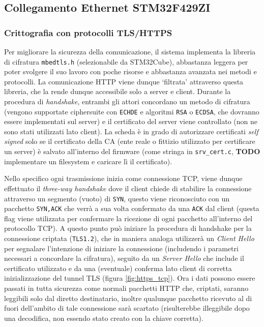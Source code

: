 \subsection{Collegamento Ethernet STM32F429ZI}

\subsubsection{Crittografia con protocolli TLS/HTTPS}

Per migliorare la sicurezza della comunicazione, il sistema implementa la libreria di cifratura \texttt{mbedtls.h} (selezionabile da STM32Cube), abbastanza leggera per poter svolgere il suo lavoro con poche risorse e abbastanza avanzata nei metodi e protocolli. La comunicazione HTTP viene dunque `filtrata' attraverso questa libreria, che la rende dunque accessibile solo a server e client. Durante la procedura di \textit{handshake}, entrambi gli attori concordano un metodo di cifratura (vengono supportate ciphersuite con \texttt{ECHDE} e algoritmi \texttt{RSA} o \texttt{ECDSA}, che dovranno essere implementati sul server) e il certificato del server viene controllato (non ne sono stati utilizzati lato client). La scheda \`e in grado di autorizzare certificati \textit{self signed} solo se il certificato della CA (ente reale o fittizio utilizzato per certificare un server) \`e salvato all'interno del firmware (come stringa in \texttt{srv\_cert.c}, \textbf{TODO} implementare un filesystem e caricare l\`i il certificato).

Nello specifico ogni trasmissione inizia come connessione TCP, viene dunque effettuato il \textit{three-way handshake} dove il client chiede di stabilire la connessione attraverso un segmento (vuoto) di \texttt{SYN}, questo viene riconosciuto con un pacchetto \texttt{SYN,ACK} che verr\`a a sua volta confermato da una \texttt{ACK} dal client (questa flag viene utilizzata per confermare la ricezione di ogni pacchetto all'interno del protocollo TCP). A questo punto pu\`o iniziare la procedura di handshake per la connessione criptata (\texttt{TLS1.2}), che in maniera analoga utilizzer\`a un \textit{Client Hello} per segnalare l'intenzione di iniziare la connessione (includendo i parametri necessari a concordare la cifratura), seguito da un \textit{Server Hello} che include il certificato utilizzato e da una (eventuale) conferma lato client di corretta inizializzazione del tunnel TLS (figura \ref{fig:https_tcp}). Ora i dati possono essere passati in tutta sicurezza come normali pacchetti HTTP che, criptati, saranno leggibili solo dal diretto destinatario, inoltre qualunque pacchetto ricevuto al di fuori dell'ambito di tale connessione sar\`a scartato (risulterebbe illeggibile dopo una decodifica, non essendo stato creato con la chiave corretta).

